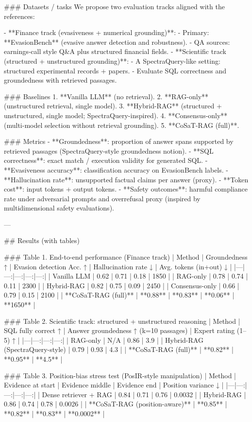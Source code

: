 ### Datasets / tasks  
We propose two evaluation tracks aligned with the references:

- **Finance track (evasiveness + numerical grounding)**:  
  - Primary: **EvasionBench** (evasive answer detection and robustness).  
  - QA sources: earnings-call style Q&A plus structured financial fields.  
- **Scientific track (structured + unstructured grounding)**:  
  - A SpectraQuery-like setting: structured experimental records + papers.  
  - Evaluate SQL correctness and groundedness with retrieved passages.

### Baselines  
1. **Vanilla LLM** (no retrieval).  
2. **RAG-only** (unstructured retrieval, single model).  
3. **Hybrid-RAG** (structured + unstructured, single model; SpectraQuery-inspired).  
4. **Consensus-only** (multi-model selection without retrieval grounding).  
5. **CoSaT-RAG (full)**.

### Metrics  
- **Groundedness**: proportion of answer spans supported by retrieved passages (SpectraQuery-style groundedness notion).  
- **SQL correctness**: exact match / execution validity for generated SQL.  
- **Evasiveness accuracy**: classification accuracy on EvasionBench labels.  
- **Hallucination rate**: unsupported factual claims per answer (proxy).  
- **Token cost**: input tokens + output tokens.  
- **Safety outcomes**: harmful compliance rate under adversarial prompts and overrefusal proxy (inspired by multidimensional safety evaluations).

---

## Results (with tables)

### Table 1. End-to-end performance (Finance track)  
| Method | Groundedness ↑ | Evasion detection Acc. ↑ | Hallucination rate ↓ | Avg. tokens (in+out) ↓ |
|---|---:|---:|---:|---:|
| Vanilla LLM | 0.62 | 0.71 | 0.18 | 1850 |
| RAG-only | 0.78 | 0.74 | 0.11 | 2300 |
| Hybrid-RAG | 0.82 | 0.75 | 0.09 | 2450 |
| Consensus-only | 0.66 | 0.79 | 0.15 | 2100 |
| **CoSaT-RAG (full)** | **0.88** | **0.83** | **0.06** | **1650** |

### Table 2. Scientific track: structured + unstructured reasoning  
| Method | SQL fully correct ↑ | Answer groundedness ↑ (k=10 passages) | Expert rating (1–5) ↑ |
|---|---:|---:|---:|
| RAG-only | N/A | 0.86 | 3.9 |
| Hybrid-RAG (SpectraQuery-style) | 0.79 | 0.93 | 4.3 |
| **CoSaT-RAG (full)** | **0.82** | **0.95** | **4.5** |

### Table 3. Position-bias stress test (PosIR-style manipulation)  
| Method | Evidence at start | Evidence middle | Evidence end | Position variance ↓ |
|---|---:|---:|---:|---:|
| Dense retriever + RAG | 0.84 | 0.71 | 0.76 | 0.0032 |
| Hybrid-RAG | 0.86 | 0.74 | 0.78 | 0.0026 |
| **CoSaT-RAG (position-aware)** | **0.85** | **0.82** | **0.83** | **0.0002** |

